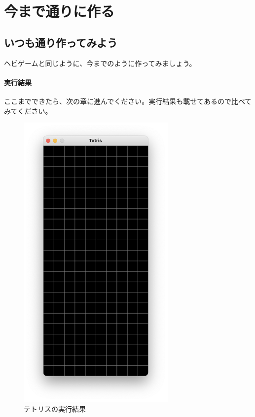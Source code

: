 \chapter{今まで通りに作る}
\section{いつも通り作ってみよう}
ヘビゲームと同じように、今までのように作ってみましょう。

\newpage
\subsubsection{実行結果}
ここまでできたら、次の章に進んでください。実行結果も載せてあるので比べてみてください。
\begin{figure}[h]
  \centering
  \includegraphics[height=15cm, natwidth=824,natheight=1600]{images/TetrisCH1_1.png}
  \caption{テトリスの実行結果}
\end{figure}